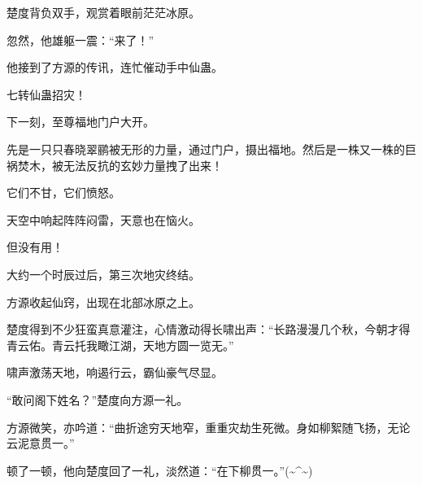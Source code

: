 \begin{this_body}
楚度背负双手，观赏着眼前茫茫冰原。

忽然，他雄躯一震：“来了！”

他接到了方源的传讯，连忙催动手中仙蛊。

七转仙蛊招灾！

下一刻，至尊福地门户大开。

先是一只只春晓翠鹂被无形的力量，通过门户，摄出福地。然后是一株又一株的巨祸焚木，被无法反抗的玄妙力量拽了出来！

它们不甘，它们愤怒。

天空中响起阵阵闷雷，天意也在恼火。

但没有用！

大约一个时辰过后，第三次地灾终结。

方源收起仙窍，出现在北部冰原之上。

楚度得到不少狂蛮真意灌注，心情激动得长啸出声：“长路漫漫几个秋，今朝才得青云佑。青云托我瞰江湖，天地方圆一览无。”

啸声激荡天地，响遏行云，霸仙豪气尽显。

“敢问阁下姓名？”楚度向方源一礼。

方源微笑，亦吟道：“曲折途穷天地窄，重重灾劫生死微。身如柳絮随飞扬，无论云泥意贯一。”

顿了一顿，他向楚度回了一礼，淡然道：“在下柳贯一。”(\~{}\^{}\~{})

\end{this_body}

